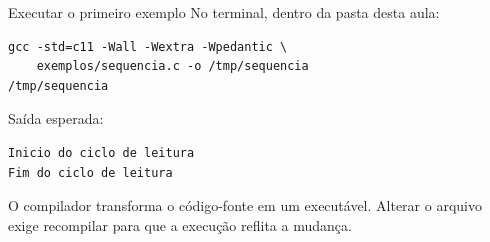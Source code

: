 \begin{frame}[fragile,t]{Executar o primeiro exemplo}
No terminal, dentro da pasta desta aula:
\begin{lstlisting}[language={}]
gcc -std=c11 -Wall -Wextra -Wpedantic \
    exemplos/sequencia.c -o /tmp/sequencia
/tmp/sequencia
\end{lstlisting}
Saída esperada:
\begin{lstlisting}[language={}]
Inicio do ciclo de leitura
Fim do ciclo de leitura
\end{lstlisting}
\small O compilador transforma o código-fonte em um executável. Alterar o arquivo exige recompilar para que a execução reflita a mudança.
\end{frame}
